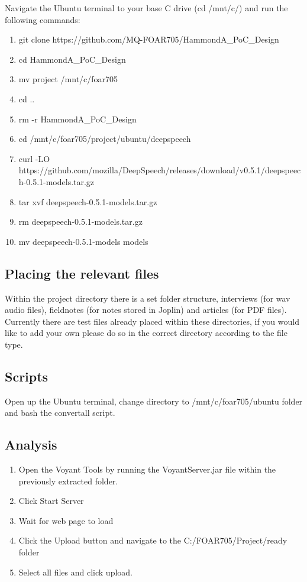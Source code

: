 \documentclass{article}
\begin{document}
Navigate the Ubuntu terminal to your base C drive (cd /mnt/c/) and run the following commands:
\begin{enumerate}
    \item git clone https://github.com/MQ-FOAR705/HammondA\_PoC\_Design
    \item cd HammondA\_PoC\_Design
    \item mv project /mnt/c/foar705
    \item cd ..
    \item rm -r HammondA\_PoC\_Design
    \item cd /mnt/c/foar705/project/ubuntu/deepspeech
    \item curl -LO https://github.com/mozilla/DeepSpeech/releases/download/v0.5.1/deepspeech-0.5.1-models.tar.gz
    \item tar xvf deepspeech-0.5.1-models.tar.gz
    \item rm deepspeech-0.5.1-models.tar.gz
    \item mv deepspeech-0.5.1-models models
\end{enumerate}

\subsection{Placing the relevant files}
Within the project directory there is a set folder structure, interviews (for wav audio files), fieldnotes (for notes stored in Joplin) and articles (for PDF files). Currently there are test files already placed within these directories, if you would like to add your own please do so in the correct directory according to the file type.

\subsection{Scripts}
Open up the Ubuntu terminal, change directory to /mnt/c/foar705/ubuntu folder and bash the convertall script.

\subsection{Analysis}
\begin{enumerate}
    \item Open the Voyant Tools by running the VoyantServer.jar file within the previously extracted folder.
    \item Click Start Server
    \item Wait for web page to load
    \item Click the Upload button and navigate to the C:/FOAR705/Project/ready folder
    \item Select all files and click upload.
\end{enumerate}
\end{document}

